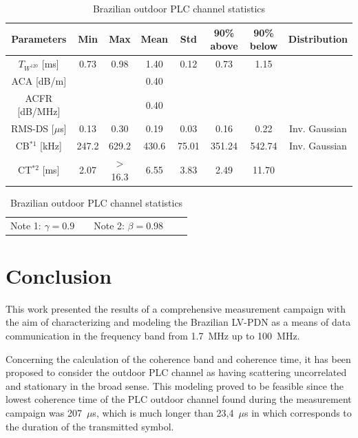 \documentclass[journal]{IEEEtran}
\begin{document}
	\begin{table}[!htb]
		\centering
		\caption{Brazilian outdoor PLC channel statistics}
		\begin{tabular}{c|c|c|c|c|c|c|c}
			\hline 
			Parameters           & Min    & Max    & Mean     & Std     & 90\% above    & 90\% below & Distribution\\
			\hline
			$T_{W^{120}}$ [ms]   & 0.73   & 0.98   &  1.40    & 0.12    &  0.73         & 1.15       & \\
			\hline
			ACA [dB/m]          &        &        &  0.40    &         &               &            & \\
			\hline
			ACFR [dB/MHz]        &        &        &  0.40    &         &               &            & \\
			\hline
			RMS-DS [$\mu$s]      & 0.13   & 0.30   & 0.19     & 0.03    & 0.16          & 0.22       & Inv. Gaussian\\
			\hline
			CB$^{*1}$ [kHz]      & 247.2  & 629.2  & 430.6    & 75.01   & 351.24        & 542.74     & Inv. Gaussian\\
			\hline
			CT$^{*2}$ [ms]       & 2.07   & $>$16.3  & 6.55     & 3.83    & 2.49          & 11.70      & \\
			\hline 
		\end{tabular} \label{Tab:Estatisticas}
		\newline
		\begin{tabular}{ccccc}
			Note 1: $\gamma = 0.9$ &  &Note 2: $\beta=0.98$ & & \\  
		\end{tabular}
	\end{table}
	
	
	\section{Conclusion}\label{sec-conclusao}
	This work presented the results of a comprehensive measurement campaign with the aim of characterizing and modeling the Brazilian \ac{LV-PDN} as a means of data communication in the frequency band from 1.7~MHz up to 100~MHz.
	
	Concerning the calculation of the coherence band and coherence time, it has been proposed to consider the outdoor \ac{PLC} channel as having scattering uncorrelated and stationary in the broad sense. This modeling proved to be feasible since the lowest coherence time of the \ac{PLC} outdoor channel found during the measurement campaign was 207~$\mu$s, which is much longer than 23,4~$\mu$s in which corresponds to the duration of the transmitted symbol. 
	
\end{document}
